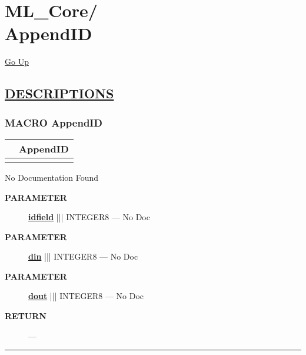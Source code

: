 \chapter*{\color{headfile}
{\large ML\_Core\slash\hspace{0pt}}
 \\
AppendID
}
\hypertarget{ecldoc:toc:ML_Core.AppendID}{}
\hyperlink{ecldoc:toc:root/ML_Core}{Go Up}


\section*{\underline{\textsf{DESCRIPTIONS}}}
\subsection*{\textsf{\colorbox{headtoc}{\color{white} MACRO}
AppendID}}

\hypertarget{ecldoc:ml_core.appendid}{}

{\renewcommand{\arraystretch}{1.5}
\begin{tabularx}{\textwidth}{|>{\raggedright\arraybackslash}l|X|}
\hline
\hspace{0pt}\mytexttt{\color{red} } & \textbf{AppendID} \\
\hline
\multicolumn{2}{|>{\raggedright\arraybackslash}X|}{\hspace{0pt}\mytexttt{\color{param} (dIn,idfield,dOut)}} \\
\hline
\end{tabularx}
}

\par





No Documentation Found






\par
\begin{description}
\item [\colorbox{tagtype}{\color{white} \textbf{\textsf{PARAMETER}}}] \textbf{\underline{idfield}} ||| INTEGER8 --- No Doc
\item [\colorbox{tagtype}{\color{white} \textbf{\textsf{PARAMETER}}}] \textbf{\underline{din}} ||| INTEGER8 --- No Doc
\item [\colorbox{tagtype}{\color{white} \textbf{\textsf{PARAMETER}}}] \textbf{\underline{dout}} ||| INTEGER8 --- No Doc
\end{description}







\par
\begin{description}
\item [\colorbox{tagtype}{\color{white} \textbf{\textsf{RETURN}}}] \textbf{} --- 
\end{description}




\rule{\linewidth}{0.5pt}
